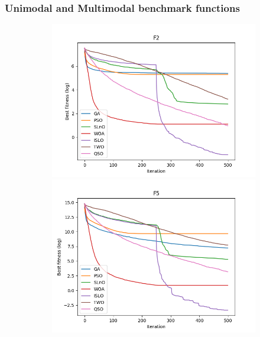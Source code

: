 \documentclass[a4paper,13pt,2p]{report}
\begin{document}
\subsubsection{Unimodal and Multimodal benchmark functions}
\begin{figure}[!ht] 
   \centering
   \begin{subfigure}{0.49\textwidth}
   	\includegraphics[width=1\linewidth]{png/convergence/islo_uni_F2}
  	 \includegraphics[width=1\linewidth]{png/convergence/islo_uni_F5}

\end{subfigure}
\end{figure}
\end{document}
